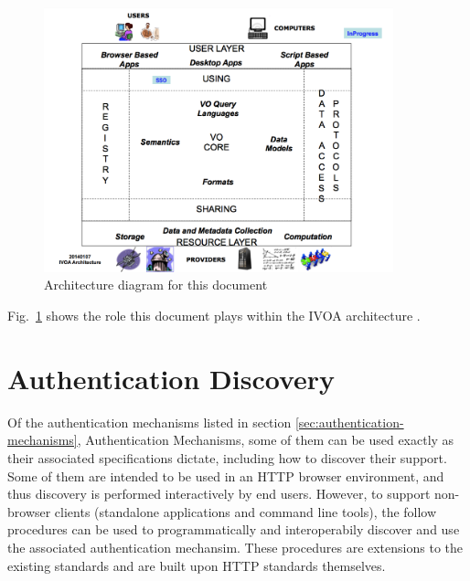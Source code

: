 \documentclass[11pt,a4paper]{ivoa}
\begin{document}
\begin{figure}
\centering

\includegraphics[width=0.9\textwidth]{SSO_image001.png}
\caption{Architecture diagram for this document}
\label{fig:archdiag}
\end{figure}

Fig.~\ref{fig:archdiag} shows the role this document plays within the
IVOA architecture \citep{2010ivoa.rept.1123A}.

\section{Authentication Discovery}

Of the authentication mechanisms listed in section
\ref{sec:authentication-mechanisms}, Authentication Mechanisms, some of
them can be used exactly as their associated specifications dictate,
including how to discover their support.  Some of them are intended to
be used in an HTTP browser environment, and thus discovery is performed
interactively by end users.  However, to support non-browser clients
(standalone applications and command line tools), the follow procedures
can be used to programmatically and interoperabily discover and use the
associated authentication mechansim.  These procedures are extensions to
the existing standards and are built upon HTTP standards themselves.
\end{document}
